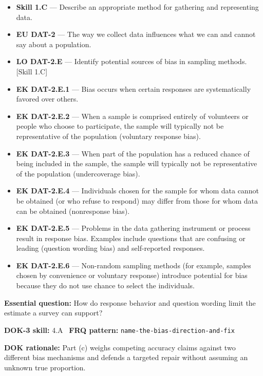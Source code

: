 \documentclass[11pt]{article}
\begin{document}


{\small
\begin{itemize}[leftmargin=1.5em,itemsep=2pt,topsep=2pt]
  \item \textbf{Skill 1.C} --- Describe an appropriate method for gathering and representing data.
  \item \textbf{EU DAT-2} --- The way we collect data influences what we can and cannot say about a population.
  \item \textbf{LO DAT-2.E} --- Identify potential sources of bias in sampling methods. [Skill 1.C]
  \item \textbf{EK DAT-2.E.1} --- Bias occurs when certain responses are systematically favored over others.
  \item \textbf{EK DAT-2.E.2} --- When a sample is comprised entirely of volunteers or people who choose to participate, the sample will typically not be representative of the population (voluntary response bias).
  \item \textbf{EK DAT-2.E.3} --- When part of the population has a reduced chance of being included in the sample, the sample will typically not be representative of the population (undercoverage bias).
  \item \textbf{EK DAT-2.E.4} --- Individuals chosen for the sample for whom data cannot be obtained (or who refuse to respond) may differ from those for whom data can be obtained (nonresponse bias).
  \item \textbf{EK DAT-2.E.5} --- Problems in the data gathering instrument or process result in response bias. Examples include questions that are confusing or leading (question wording bias) and self-reported responses.
  \item \textbf{EK DAT-2.E.6} --- Non-random sampling methods (for example, samples chosen by convenience or voluntary response) introduce potential for bias because they do not use chance to select the individuals.
\end{itemize}
}
\textbf{Essential question:} How do response behavior and question wording limit the estimate a survey can support?\par
\textbf{DOK-3 skill:} 4.A \textperiodcentered\ \textbf{FRQ pattern:} {\small\texttt{name-\allowbreak{}the-\allowbreak{}bias-\allowbreak{}direction-\allowbreak{}and-\allowbreak{}fix}}\par
\textbf{DOK rationale:} Part (c) weighs competing accuracy claims against two different bias mechanisms and defends a targeted repair without assuming an unknown true proportion.\par
\end{document}
